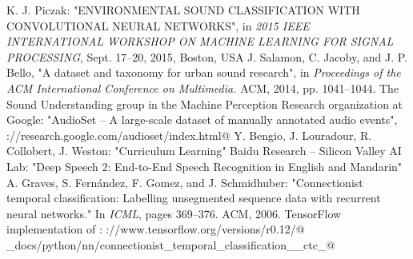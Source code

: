 \documentclass[utf-8]{article}
\begin{document}
\begin{thebibliography}{5}
 K. J. Piczak: "ENVIRONMENTAL SOUND CLASSIFICATION
WITH CONVOLUTIONAL NEURAL NETWORKS", in \textit{2015 IEEE INTERNATIONAL WORKSHOP ON MACHINE LEARNING FOR SIGNAL PROCESSING}, Sept. 17–20, 2015, Boston, USA
 J. Salamon, C. Jacoby, and J. P. Bello, "A dataset and
taxonomy for urban sound research", in \textit{Proceedings
of the ACM International Conference on Multimedia.}
ACM, 2014, pp. 1041–1044.
 The Sound Understanding group in the Machine Perception Research organization at Google: "AudioSet -- A large-scale dataset of manually annotated audio events", \verb@https://research.google.com/audioset/index.html@
 Y. Bengio, J. Louradour, R. Collobert, J. Weston: "Curriculum Learning"
 Baidu Research – Silicon Valley AI Lab: "Deep Speech 2: End-to-End Speech Recognition in
English and Mandarin"
 A. Graves, S. Fernández, F. Gomez, and J. Schmidhuber: "Connectionist temporal classification: Labelling
unsegmented sequence data with recurrent neural networks." In \textit{ICML}, pages 369–376. ACM, 2006.
 TensorFlow implementation of \cite{ctc}:  
\verb@https://www.tensorflow.org/versions/r0.12/@\\
\verb@api_docs/python/nn/connectionist_temporal_classification__ctc_@ 
\end{thebibliography}
\end{document}
